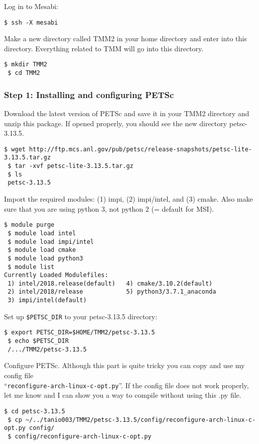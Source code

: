 \documentclass[a4paper]{article}
\def\noin{\noindent }
\begin{document}
\noin Log in to Mesabi: 
\begin{lstlisting}[style=DOS]
 $ ssh -X mesabi
\end{lstlisting}

\noin Make a new directory called TMM2 in your home directory and enter into this directory. Everything related to TMM will go into this directory.
\begin{lstlisting}[style=DOS]
 $ mkdir TMM2
 $ cd TMM2
\end{lstlisting}

\subsubsection{Step 1: Installing and configuring PETSc}

\noin Download the latest version of PETSc and save it in your TMM2 directory and unzip this package. If opened properly, you should see the new directory petsc-3.13.5. 
\begin{lstlisting}[style=DOS]
 $ wget http://ftp.mcs.anl.gov/pub/petsc/release-snapshots/petsc-lite-3.13.5.tar.gz
 $ tar -xvf petsc-lite-3.13.5.tar.gz
 $ ls
 petsc-3.13.5
\end{lstlisting}

\noin Import the required modules: (1) impi, (2) impi/intel, and (3) cmake. Also make sure that you are using python 3, not python 2 (= default for MSI). 
\begin{lstlisting}[style=DOS]
 $ module purge 
 $ module load intel
 $ module load impi/intel
 $ module load cmake
 $ module load python3
 $ module list
Currently Loaded Modulefiles:
 1) intel/2018.release(default)   4) cmake/3.10.2(default)
 2) intel/2018/release            5) python3/3.7.1_anaconda
 3) impi/intel(default)
\end{lstlisting}

\noin Set up \verb/$PETSC_DIR/ to your petsc-3.13.5 directory:
\begin{lstlisting}[style=DOS]
 $ export PETSC_DIR=$HOME/TMM2/petsc-3.13.5
 $ echo $PETSC_DIR 
 /.../TMM2/petsc-3.13.5
\end{lstlisting}

\noin Configure PETSc. Although this part is quite tricky you can copy and use my config file \\ ``\verb/reconfigure-arch-linux-c-opt.py/''. If the config file does not work properly, let me know and I can show you a way to compile without using this .py file. 
\begin{lstlisting}[style=DOS]
 $ cd petsc-3.13.5
 $ cp ~/../tanio003/TMM2/petsc-3.13.5/config/reconfigure-arch-linux-c-opt.py config/
 $ config/reconfigure-arch-linux-c-opt.py
\end{lstlisting}
\end{document}
